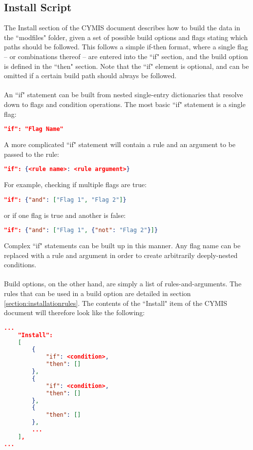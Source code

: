 \documentclass{article}
\begin{document}
\subsection{Install Script}\label{section:installscript}
The Install section of the CYMIS document describes how to build the data in the ``modfiles" folder, given a set of possible build options and flags stating which paths should be followed. This follows a simple if-then format, where a single flag -- or combinations thereof -- are entered into the ``if" section, and the build option is defined in the ``then" section. Note that the ``if" element is optional, and can be omitted if a certain build path should always be followed.\\\\
An ``if" statement can be built from nested single-entry dictionaries that resolve down to flags and condition operations. The most basic ``if" statement is a single flag:
\begin{lstlisting}[language=json,firstnumber=1]
"if": "Flag Name"
\end{lstlisting}
A more complicated ``if" statement will contain a rule and an argument to be passed to the rule:
\begin{lstlisting}[language=json,firstnumber=1]
"if": {<rule name>: <rule argument>}
\end{lstlisting}
For example, checking if multiple flags are true:
\begin{lstlisting}[language=json,firstnumber=1]
"if": {"and": ["Flag 1", "Flag 2"]}
\end{lstlisting}
or if one flag is true and another is false:
\begin{lstlisting}[language=json,firstnumber=1]
"if": {"and": ["Flag 1", {"not": "Flag 2"}]}
\end{lstlisting}
Complex ``if" statements can be built up in this manner. Any flag name can be replaced with a rule and argument in order to create arbitrarily deeply-nested conditions.\\\\
Build options, on the other hand, are simply a list of rules-and-arguments. The rules that can be used in a build option are detailed in section \ref{section:installationrules}.
\newpage
\noindent The contents of the ``Install" item of the CYMIS document will therefore look like the following:
\begin{lstlisting}[language=json,firstnumber=1]
...
    "Install": 
    [
        {
            "if": <condition>,
            "then": []   
        },
        {
            "if": <condition>,
            "then": []   
        },
        {
            "then": []   
        },
        ...
    ],
...
\end{lstlisting}
\newpage
\end{document}

